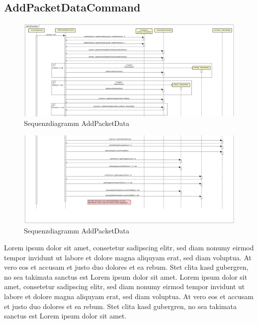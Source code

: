\subsection{AddPacketDataCommand}
\begin{figure}
  \centering
  \includegraphics[width=\paperwidth]{../diagramimages/sd_AddPacketData1.png}
  \caption[Sequenzdiagramm AddPacketData]{Sequenzdiagramm AddPacketData}
\end{figure}
\FloatBarrier

\begin{figure}
  \centering
  \includegraphics[width=\paperwidth]{../diagramimages/sd_AddPacketData2.png}
  \caption[Sequenzdiagramm AddPacketData]{Sequenzdiagramm AddPacketData}
\end{figure}
\FloatBarrier

Lorem ipsum dolor sit amet, consetetur sadipscing elitr, sed diam nonumy eirmod tempor invidunt ut labore et dolore magna aliquyam erat, sed diam voluptua. At vero eos et accusam et justo duo dolores et ea rebum. Stet clita kasd gubergren, no sea takimata sanctus est Lorem ipsum dolor sit amet. Lorem ipsum dolor sit amet, consetetur sadipscing elitr, sed diam nonumy eirmod tempor invidunt ut labore et dolore magna aliquyam erat, sed diam voluptua. At vero eos et accusam et justo duo dolores et ea rebum. Stet clita kasd gubergren, no sea takimata sanctus est Lorem ipsum dolor sit amet. 
